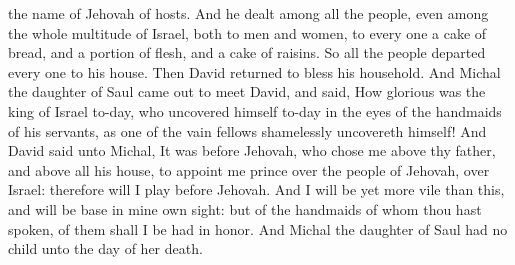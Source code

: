 the name of Jehovah of hosts. And he dealt among all the people, even among the whole multitude of Israel, both to men and women, to every one a cake of bread, and a portion of flesh, and a cake of raisins. So all the people departed every one to his house.  Then David returned to bless his household. And Michal the daughter of Saul came out to meet David, and said, How glorious was the king of Israel to-day, who uncovered himself to-day in the eyes of the handmaids of his servants, as one of the vain fellows shamelessly uncovereth himself! And David said unto Michal, It was before Jehovah, who chose me above thy father, and above all his house, to appoint me prince over the people of Jehovah, over Israel: therefore will I play before Jehovah. And I will be yet more vile than this, and will be base in mine own sight: but of the handmaids of whom thou hast spoken, of them shall I be had in honor. And Michal the daughter of Saul had no child unto the day of her death. 

